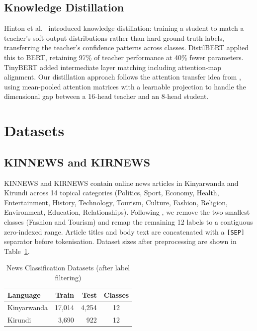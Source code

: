 \documentclass[conference]{IEEEtran}
\begin{document}
\subsection{Knowledge Distillation}
Hinton et al.\ \cite{b_hinton} introduced knowledge distillation: training
a student to match a teacher's soft output distributions rather than hard
ground-truth labels, transferring the teacher's confidence patterns
across classes. DistilBERT \cite{b_sanh} applied this to BERT, retaining
97\% of teacher performance at 40\% fewer parameters. TinyBERT
\cite{b_jiao} added intermediate layer matching including attention-map
alignment. Our distillation approach follows the attention transfer idea
from \cite{b_zagoruyko}, using mean-pooled attention matrices with a
learnable projection to handle the dimensional gap between a 16-head
teacher and an 8-head student.

\section{Datasets}\label{sec:data}

\subsection{KINNEWS and KIRNEWS}
KINNEWS and KIRNEWS \cite{b_kinnews} contain online news articles in
Kinyarwanda and Kirundi across 14 topical categories (Politics, Sport,
Economy, Health, Entertainment, History, Technology, Tourism, Culture,
Fashion, Religion, Environment, Education, Relationships). Following
\cite{b_thangaraj}, we remove the two smallest classes (Fashion and
Tourism) and remap the remaining 12 labels to a contiguous zero-indexed
range. Article titles and body text are concatenated with a
\texttt{[SEP]} separator before tokenisation. Dataset sizes after
preprocessing are shown in Table~\ref{tab:data_news}.

\begin{table}[htbp]
\caption{News Classification Datasets (after label filtering)}
\label{tab:data_news}
\begin{center}
\begin{tabular}{lrrc}
\toprule
\textbf{Language} & \textbf{Train} & \textbf{Test} & \textbf{Classes} \\
\midrule
Kinyarwanda & 17,014 & 4,254 & 12 \\
Kirundi     &  3,690 &   922 & 12 \\
\bottomrule
\end{tabular}
\end{center}
\end{table}
\end{document}
